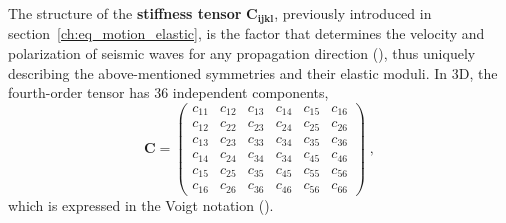 The structure of the \textbf{stiffness tensor} $\mathbf{C_{ijkl}}$, previously introduced in section~\ref{ch:eq_motion_elastic}, is the factor that determines the velocity and polarization of seismic waves for any propagation direction (\cite{Tsvankin:12}), thus uniquely describing the above-mentioned symmetries and their elastic moduli. In 3D, the fourth-order tensor has 36 independent components,
\begin{equation}
    \mathbf{C} = 
    \begin{pmatrix}
    c_{11} & c_{12} & c_{13} & c_{14} & c_{15} & c_{16} \\
    c_{12} & c_{22} & c_{23} & c_{24} & c_{25} & c_{26} \\
    c_{13} & c_{23} & c_{33} & c_{34} & c_{35} & c_{36} \\
    c_{14} & c_{24} & c_{34} & c_{34} & c_{45} & c_{46} \\
    c_{15} & c_{25} & c_{35} & c_{45} & c_{55} & c_{56} \\
    c_{16} & c_{26} & c_{36} & c_{46} & c_{56} & c_{66} 
    \end{pmatrix}\;,
    \label{eq:voigt_C}
\end{equation}
which is expressed in the Voigt notation (\cite{Voigt:10}).

